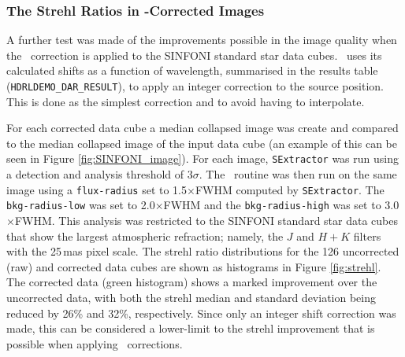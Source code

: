 \subsubsection{The Strehl Ratios in \hdrldar-Corrected Images}

A further test was made of the improvements possible in the image quality when the \hdrldar\ correction is applied to the SINFONI standard star data cubes.
\hdrldar\ uses its calculated shifts as a function of wavelength, summarised in the results table ({\tt HDRLDEMO\_DAR\_RESULT}), to apply an integer correction 
to the source position.  This is done as the simplest correction and to avoid having to interpolate.

For each corrected data cube a median collapsed image was create and compared to the median collapsed image of the input data cube (an example of this can be
seen in Figure \ref{fig:SINFONI_image}).   For each image, {\tt SExtractor} was run using a detection and analysis threshold of 3$\sigma$.  The \hdrlstrehl\ routine
was then run on the same image using a {\tt flux-radius} set to 1.5$\times$FWHM computed by {\tt SExtractor}.   The {\tt bkg-radius-low} was set to 2.0$\times$FWHM and the
{\tt bkg-radius-high} was set to 3.0$\times$FWHM.  This analysis was restricted to the SINFONI standard star data cubes that show the largest atmospheric refraction; namely,
the $J$ and $H+K$ filters with the 25\,mas pixel scale.   The strehl ratio distributions for the 126 uncorrected (raw) and corrected data cubes are shown as histograms in 
Figure \ref{fig:strehl}.   The corrected data (green histogram) shows a marked improvement over the uncorrected data, with both the strehl median and standard deviation being 
reduced by 26\% and 32\%, respectively.  Since only an integer shift correction was made, this can be considered a lower-limit to the strehl improvement that is possible
when applying \hdrldar\ corrections.


